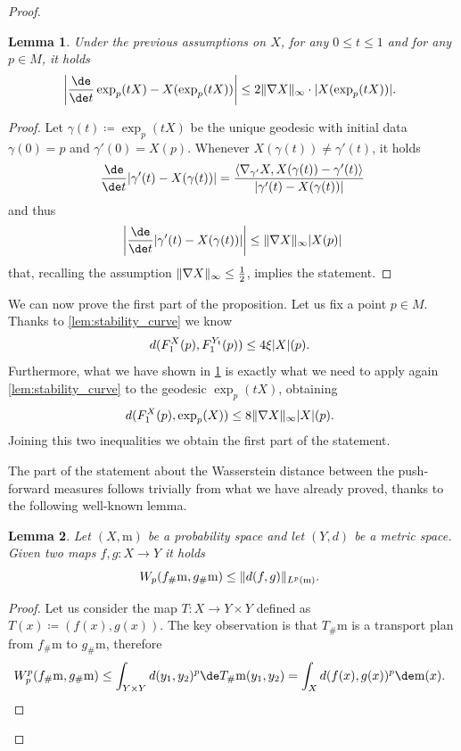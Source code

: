 \documentclass[10pt]{amsart}
\theoremstyle{plain}
\newtheorem{lemma}[lemma]{Lemma}
\theoremstyle{definition}
\numberwithin{equation}{section}
\newcommand{\defeq}{\ensuremath{\coloneqq}}
\newcommand{\fullstop}{\ensuremath{\text{. }}}
\newcommand{\m}{\ensuremath{\mathrm m}}
\newcommand{\scalprod}[2]{\ensuremath{\langle #1, #2\rangle}}
\DeclarePairedDelimiter\abs{\lvert}{\rvert}
\DeclarePairedDelimiter\norm{\lVert}{\rVert}
\providecommand{\skipqed}{\renewcommand{\qedsymbol}{}}
\begin{document}
\begin{proof}
\begin{lemma}\label{lem:derivative_geodesic}
Under the previous assumptions on $X$,
for any $0\le t\le 1$ and for any $p\in M$, it holds
\begin{equation*}
\abs*{\frac{\de}{\de t}\exp_p(tX)-X(\exp_p(tX))}\le
2\norm{\nabla X}_{\infty}\cdot\abs{X(\exp_p(tX))} \fullstop
\end{equation*}
\end{lemma}
\begin{proof}
Let $\gamma(t)\defeq \exp_p(tX)$ be the unique geodesic with initial data $\gamma(0)=p$ and
$\gamma'(0)=X(p)$.
Whenever $X(\gamma(t))\not=\gamma'(t)$, it holds
\begin{equation*}
\frac{\de}{\de t}\abs*{\gamma'(t)-X(\gamma(t))} =
\frac{\scalprod{\nabla_{\gamma'}X}{X(\gamma(t))-\gamma'(t)}}{\abs*{\gamma'(t)-X(\gamma(t))}}
\end{equation*}
and thus
\begin{equation*}
\abs*{\frac{\de}{\de t}\abs*{\gamma'(t)-X(\gamma(t))}} \le \norm{\nabla X}_\infty\abs{X(p)}
\end{equation*}
that, recalling the assumption $\norm{\nabla X}_\infty\le\frac12$, implies the statement.
\end{proof}

We can now prove the first part of the proposition.
Let us fix a point $p\in M$. Thanks to \cref{lem:stability_curve} we know
\begin{equation*}
d(F_1^X(p), F_1^{Y_t}(p)) \le 4\xi\abs{X}(p) \fullstop
\end{equation*}
Furthermore, what we have shown in \cref{lem:derivative_geodesic} is exactly what we need to apply again
\cref{lem:stability_curve} to the geodesic $\exp_p(tX)$, obtaining
\begin{equation*}
d(F_1^X(p), \exp_p(X)) \le 8\norm{\nabla X}_\infty\abs{X}(p) \fullstop
\end{equation*}
Joining this two inequalities we obtain the first part of the statement.

The part of the statement about the Wasserstein distance between the push-forward measures follows trivially
from what we have already proved, thanks to the following well-known lemma.

\begin{lemma}\label{lem:near_maps_near_measures}
Let $(X,\m)$ be a probability space and let $(Y, d)$ be a metric space.
Given two maps $f, g:X\to Y$ it holds
\begin{equation*}
W_p(f_\#\m, g_\#\m) \le \norm{d(f, g)}_{L^p(\m)}\fullstop
\end{equation*}
\end{lemma}
\begin{proof}
Let us consider the map $T:X\to Y\times Y$ defined as $T(x)\defeq (f(x), g(x))$.
The key observation is that $T_\#\m$ is a transport plan from $f_\#\m$ to $g_\#\m$, therefore
\begin{equation*}
W_p^p(f_\#\m, g_\#\m)\le\int_{Y\times Y} d(y_1, y_2)^p\de T_\#\m (y_1,y_2)
= \int_X d(f(x), g(x))^p\de\m(x) \fullstop\qedhere
\end{equation*}
\end{proof}
\skipqed
\end{proof}
\end{document}
